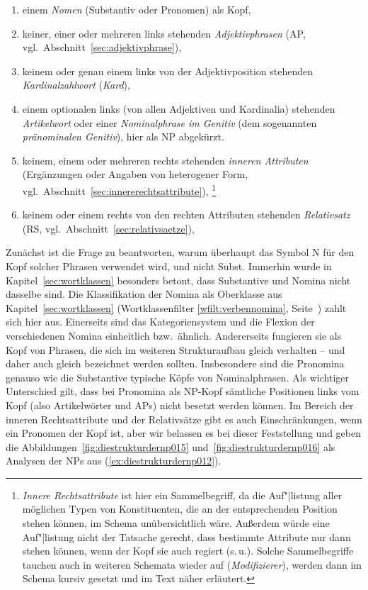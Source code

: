 \begin{enumerate}
  \item einem \textit{Nomen} (Substantiv oder Pronomen) als Kopf,
  \item keiner, einer oder mehreren links stehenden \textit{Adjektivphrasen} (AP, vgl.\ Abschnitt~\ref{sec:adjektivphrase}),
  \item keinem oder genau einem links von der Adjektivposition stehenden \textit{Kardinalzahlwort} (\textit{Kard}),
  \item einem optionalen links (von allen Adjektiven und Kardinalia) stehenden \textit{Artikelwort} oder einer \textit{Nominalphrase im Genitiv} (dem sogenannten \textit{pränominalen Genitiv}), hier als NP abgekürzt.
  \item keinem, einem oder mehreren rechts stehenden \textit{inneren Attributen} (Ergänzungen oder Angaben von heterogener Form, vgl.\ Abschnitt~\ref{sec:innererechtsattribute}),%
    \footnote{\textit{Innere Rechtsattribute} ist hier ein Sammelbegriff, da die Auf"|listung aller möglichen Typen von Konstituenten, die an der entsprechenden Position stehen können, im Schema unübersichtlich wäre.
Außerdem würde eine Auf"|listung nicht der Tatsache gerecht, dass bestimmte Attribute nur dann stehen können, wenn der Kopf sie auch regiert (s.\,u.).
Solche Sammelbegriffe tauchen auch in weiteren Schemata wieder auf (\zB \textit{Modifizierer}), werden dann im Schema kursiv gesetzt und im Text näher erläutert.
}
  \item keinem oder einem rechts von den rechten Attributen stehenden \textit{Relativsatz} (RS, vgl.\ Abschnitt~\ref{sec:relativsaetze}),
\end{enumerate}


Zunächst ist die Frage zu beantworten, warum überhaupt das Symbol N für den Kopf solcher Phrasen verwendet wird, und nicht Subst.
Immerhin wurde in Kapitel~\ref{sec:wortklassen} besonders betont, dass Substantive und Nomina nicht dasselbe sind.
Die Klassifikation der Nomina als Oberklasse aus Kapitel~\ref{sec:wortklassen} (Wortklassenfilter \ref{wfilt:verbennomina}, Seite~\pageref{wfilt:verbennomina}) zahlt sich hier aus.
Einerseits sind das Kategoriensystem und die Flexion der verschiedenen Nomina einheitlich bzw.\ ähnlich.
Andererseits fungieren sie als Kopf von Phrasen, die sich im weiteren Strukturaufbau gleich verhalten -- und daher auch gleich bezeichnet werden sollten.
Insbesondere sind die Pronomina genauso wie die Substantive typische Köpfe von Nominalphrasen.
Als wichtiger Unterschied gilt, dass bei Pronomina als NP-Kopf sämtliche Positionen links vom Kopf (also Artikelwörter und APs) nicht besetzt werden können.
Im Bereich der inneren Rechtsattribute und der Relativsätze gibt es auch Einschränkungen, wenn ein Pronomen der Kopf ist, aber wir belassen es bei dieser Feststellung und geben die Abbildungen~\ref{fig:diestrukturdernp015} und~\ref{fig:diestrukturdernp016} als Analysen der NPs aus (\ref{ex:diestrukturdernp012}).

